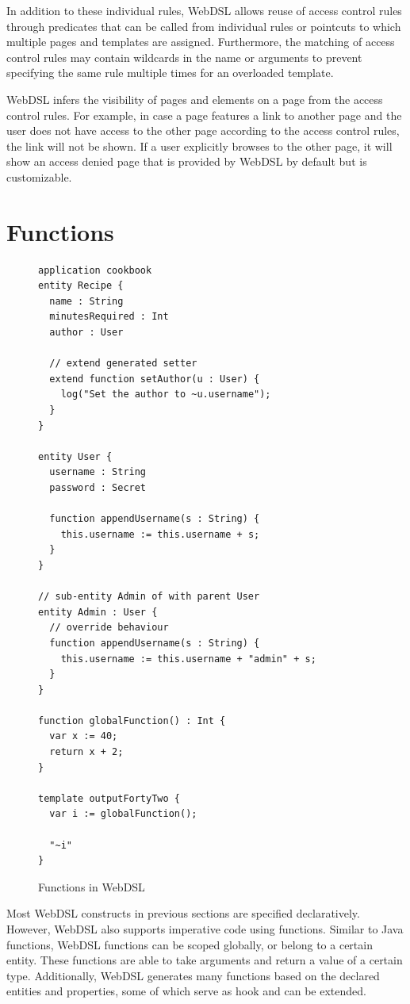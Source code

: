    In addition to these individual rules, WebDSL allows reuse of access control rules through predicates that can be called from individual rules or pointcuts to which multiple pages and templates are assigned. Furthermore, the matching of access control rules may contain wildcards in the name or arguments to prevent specifying the same rule multiple times for an overloaded template.

    WebDSL infers the visibility of pages and elements on a page from the access control rules. For example, in case a page features a link to another page and the user does not have access to the other page according to the access control rules, the link will not be shown. If a user explicitly browses to the other page, it will show an access denied page that is provided by WebDSL by default but is customizable.

  \section{\label{sec:functions}Functions}

  \begin{figure}
    \begin{verbatim}
application cookbook
entity Recipe {
  name : String
  minutesRequired : Int
  author : User

  // extend generated setter
  extend function setAuthor(u : User) {
    log("Set the author to ~u.username");
  }
}

entity User {
  username : String
  password : Secret

  function appendUsername(s : String) {
    this.username := this.username + s;
  }
}

// sub-entity Admin of with parent User
entity Admin : User {
  // override behaviour
  function appendUsername(s : String) {
    this.username := this.username + "admin" + s;
  }
}

function globalFunction() : Int {
  var x := 40;
  return x + 2;
}

template outputFortyTwo {
  var i := globalFunction();

  "~i"
}
    \end{verbatim}
    \caption{\label{fig:webdsl-functions}Functions in WebDSL}
  \end{figure}

    Most WebDSL constructs in previous sections are specified declaratively. However, WebDSL also supports imperative code using functions. Similar to Java functions, WebDSL functions can be scoped globally, or belong to a certain entity. These functions are able to take arguments and return a value of a certain type. Additionally, WebDSL generates many functions based on the declared entities and properties, some of which serve as hook and can be extended.

